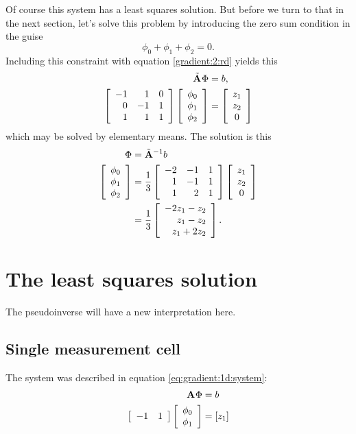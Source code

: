 Of course this system has a least squares solution. But before we turn to that in the next section, let's solve this problem by introducing the zero sum condition in the guise
\begin{equation}
  \phi_{0} + \phi_{1} + \phi_{2} = 0.
\end{equation}
Including this constraint with equation \eqref{gradient:2:rd} yields this
\begin{equation}
  \begin{split}
    \tilde{\A{}}\Phi&=b,\\
    \mat{rrr}{-1&1&0\\0&-1&1\\1&1&1}\mat{c}{\phi_{0}\\\phi_{1}\\\phi_{2}}&=\mat{c}{z_{1}\\z_{2}\\0}
  \end{split}
  \label{gradient:2:fr}
\end{equation}
which may be solved by elementary means. The solution is this
\begin{equation}
  \begin{split}
    \Phi &= \tilde{\mathbf{A}}^{-1}b\\
      \mat{c}{\phi_{0}\\\phi_{1}\\\phi_{2}}&=\frac{1}{3}\mat{rrr}{-2&-1&1\\1&-1&1\\1&2&1}\mat{c}{z_{1}\\z_{2}\\0}\\
      &= \frac{1}{3}\mat{r}{-2z_{1}-z_{2}\\z_{1}-z_{2}\\z_{1}+2z_{2}}.
  \end{split}
  \label{eq:gradient:2:reg}
\end{equation}

\section{The least squares solution}
The pseudoinverse will have a new interpretation here.

\subsection{Single measurement cell}
The system was described in equation \eqref{eq:gradient:1d:system}:
\begin{equation*}
  \begin{split}
    \A{}\Phi&=b\\
    \mat{cc}{-1&1}\mat{c}{\phi_{0}\\\phi_{1}}&=\brac{z_{1}}
  \end{split}
\end{equation*}

